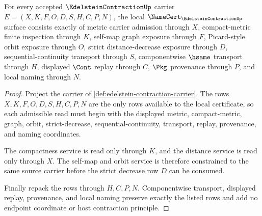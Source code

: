 \begin{theorem}
\label{thm:edelstein-contraction-namecert-obligations}
For every accepted $\EdelsteinContractionUp$ carrier $E=(X,K,F,O,D,S,H,C,P,N)$, the local $\NameCert_{\EdelsteinContractionUp}$ surface consists exactly of metric carrier admission through $X$, compact-metric finite inspection through $K$, self-map graph exposure through $F$, Picard-style orbit exposure through $O$, strict distance-decrease exposure through $D$, sequential-continuity transport through $S$, componentwise $\hsame$ transport through $H$, displayed $\Cont$ replay through $C$, $\Pkg$ provenance through $P$, and local naming through $N$.
\end{theorem}
\begin{proof}
Project the carrier of \autoref{def:edelstein-contraction-carrier}. The rows $X,K,F,O,D,S,H,C,P,N$ are the only rows available to the local certificate, so each admissible read must begin with the displayed metric, compact-metric, graph, orbit, strict-decrease, sequential-continuity, transport, replay, provenance, and naming coordinates.

The compactness service is read only through $K$, and the distance service is read only through $X$. The self-map and orbit service is therefore constrained to the same source carrier before the strict decrease row $D$ can be consumed.

Finally repack the rows through $H,C,P,N$. Componentwise transport, displayed replay, provenance, and local naming preserve exactly the listed rows and add no endpoint coordinate or host contraction principle.
\end{proof}

